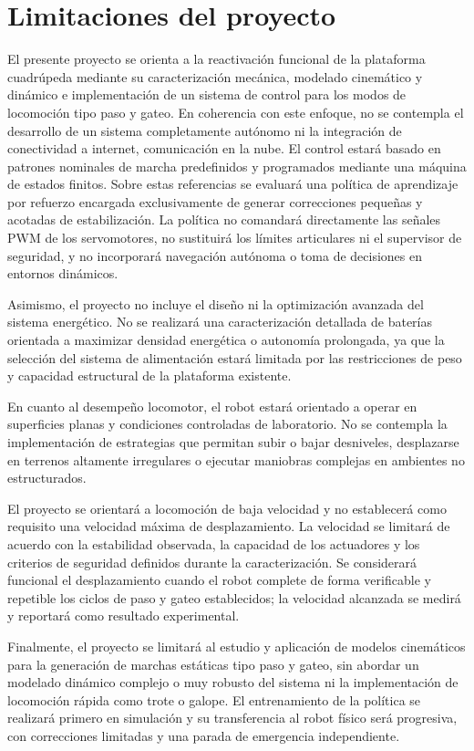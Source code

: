 \section{Limitaciones del proyecto}


El presente proyecto se orienta a la reactivación funcional de la plataforma
cuadrúpeda mediante su caracterización mecánica, modelado cinemático y dinámico e
implementación de un sistema de control para los modos de locomoción tipo paso y gateo.
En coherencia con este enfoque, no se contempla el desarrollo de un sistema
completamente autónomo ni la integración de conectividad a internet,
comunicación en la nube. El control estará
basado en patrones nominales de marcha predefinidos y programados mediante una
máquina de estados finitos. Sobre estas referencias se evaluará una política de
aprendizaje por refuerzo encargada exclusivamente de generar correcciones
pequeñas y acotadas de estabilización. La política no comandará directamente
las señales PWM de los servomotores, no sustituirá los límites articulares ni
el supervisor de seguridad, y no incorporará navegación autónoma o toma de
decisiones en entornos dinámicos.

Asimismo, el proyecto no incluye el diseño ni la optimización avanzada del
sistema energético. No se realizará una caracterización detallada de baterías
orientada a maximizar densidad energética o autonomía prolongada, ya que la
selección del sistema de alimentación estará limitada por las restricciones de
peso y capacidad estructural de la plataforma existente.

En cuanto al desempeño locomotor, el robot estará orientado a operar en
superficies planas y condiciones controladas de laboratorio. No se contempla la
implementación de estrategias que permitan subir o bajar desniveles,
desplazarse en terrenos altamente irregulares o ejecutar maniobras complejas
en ambientes no estructurados.

El proyecto se orientará a locomoción de baja velocidad y no establecerá como
requisito una velocidad máxima de desplazamiento. La velocidad se limitará de
acuerdo con la estabilidad observada, la capacidad de los actuadores y los
criterios de seguridad definidos durante la caracterización. Se considerará
funcional el desplazamiento cuando el robot complete de forma verificable y
repetible los ciclos de paso y gateo establecidos; la velocidad alcanzada se
medirá y reportará como resultado experimental.

Finalmente, el proyecto se limitará al estudio y aplicación de modelos
cinemáticos para la generación de marchas estáticas tipo paso y gateo, sin
abordar un modelado dinámico complejo o muy robusto del sistema ni la implementación de
locomoción rápida como trote o galope. El entrenamiento de la política se
realizará primero en simulación y su transferencia al robot físico será
progresiva, con correcciones limitadas y una parada de emergencia independiente.


